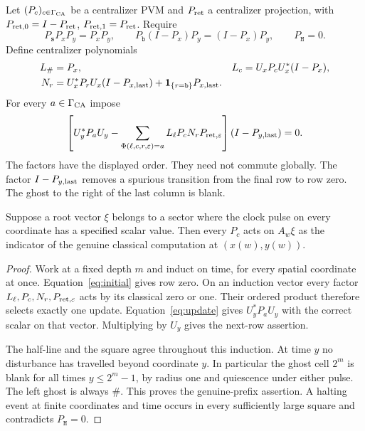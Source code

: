 Let $(P_c)_{c\in\Gamma_{\rm CA}}$ be a centralizer PVM and $P_{\rm ret}$ a centralizer projection, with $P_{{\rm ret},0}=I-P_{\rm ret}$, $P_{{\rm ret},1}=P_{\rm ret}$. Require
\begin{equation}\label{eq:initial}
 P_{\mathtt s}P_xP_y=P_xP_y,\qquad P_{\mathtt b}(I-P_x)P_y=(I-P_x)P_y,\qquad P_{\mathtt H}=0.
\end{equation}
Define centralizer polynomials
\begin{align*}
 L_\#&=P_x,& L_c&=U_xP_cU_x^*(I-P_x),\\
 N_r&=U_x^*P_rU_x(I-P_{x,\rm last})+\mathbf1_{\{r=\mathtt b\}}P_{x,\rm last}.
\end{align*}
For every $a\in\Gamma_{\rm CA}$ impose
\begin{equation}\label{eq:update}
 \left[U_y^*P_aU_y-\sum_{\Phi(\ell,c,r,\varepsilon)=a}
 L_\ell P_cN_rP_{{\rm ret},\varepsilon}\right](I-P_{y,\rm last})=0.
\end{equation}
The factors have the displayed order. They need not commute globally. The factor $I-P_{y,\rm last}$ removes a spurious transition from the final row to row zero. The ghost to the right of the last column is blank.

\begin{lemma}\label{lem:tableau}
Suppose a root vector $\xi$ belongs to a sector where the clock pulse on every coordinate has a specified scalar value. Then every $P_c$ acts on $A_w\xi$ as the indicator of the genuine classical computation at $(x(w),y(w))$.
\end{lemma}
\begin{proof}
Work at a fixed depth $m$ and induct on time, for every spatial coordinate at once. Equation~\eqref{eq:initial} gives row zero. On an induction vector every factor $L_\ell,P_c,N_r,P_{{\rm ret},\varepsilon}$ acts by its classical zero or one. Their ordered product therefore selects exactly one update. Equation~\eqref{eq:update} gives $U_y^*P_aU_y$ with the correct scalar on that vector. Multiplying by $U_y$ gives the next-row assertion.

The half-line and the square agree throughout this induction. At time $y$ no disturbance has travelled beyond coordinate $y$. In particular the ghost cell $2^m$ is blank for all times $y\leq2^m-1$, by radius one and quiescence under either pulse. The left ghost is always $\#$. This proves the genuine-prefix assertion. A halting event at finite coordinates and time occurs in every sufficiently large square and contradicts $P_{\mathtt H}=0$.
\end{proof}

